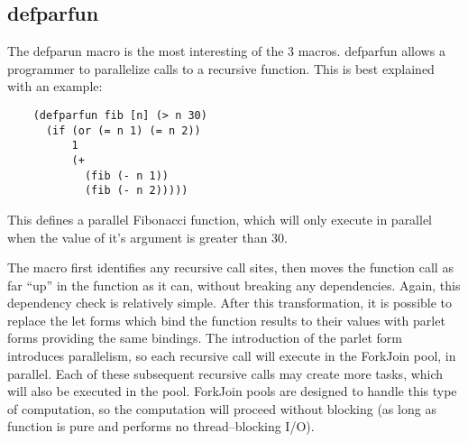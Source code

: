 \documentclass{article}
\begin{document}
\subsection{defparfun}

The defparun macro is the most interesting of the 3 macros.
defparfun allows a programmer to parallelize calls to a recursive function.
This is best explained with an example:

\begin{verbatim}
    (defparfun fib [n] (> n 30)
      (if (or (= n 1) (= n 2))
          1
          (+
            (fib (- n 1))
            (fib (- n 2)))))
\end{verbatim}

This defines a parallel Fibonacci function, which will only execute in parallel when the value of it's argument is greater than 30.

The macro first identifies any recursive call sites, then moves the function call as far ``up'' in the function as it can, without breaking any dependencies.
Again, this dependency check is relatively simple.
After this transformation, it is possible to replace the let forms which bind the function results to their values with parlet forms providing the same bindings.
The introduction of the parlet form introduces parallelism, so each recursive call will execute in the ForkJoin pool, in parallel.
Each of these subsequent recursive calls may create more tasks, which will also be executed in the pool.
ForkJoin pools are designed to handle this type of computation, so the computation will proceed without blocking (as long as function is pure and performs no thread--blocking I/O).
\end{document}
